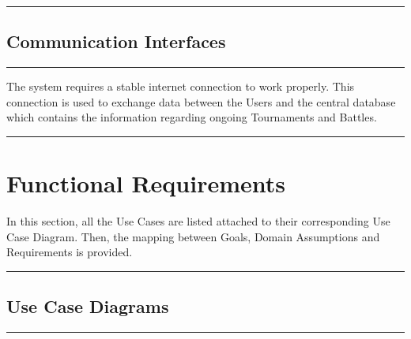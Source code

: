 \documentclass{Configuration_Files/Template}
\begin{document}
{\color{bluepoli}\rule{\linewidth}{0.1pt}}

\subsection{Communication Interfaces}

{\color{bluepoli}\rule{\linewidth}{0.1pt}}

The system requires a stable internet connection to work properly. This connection is used to exchange data between the Users and the central database which contains the information regarding ongoing Tournaments and Battles.\\

{\color{bluepoli}\rule{\linewidth}{0.1pt}}

\section{Functional Requirements}

In this section, all the Use Cases are listed attached to their corresponding Use Case Diagram. Then, the mapping between Goals, Domain Assumptions and Requirements is provided.\\
{\color{bluepoli}\rule{\linewidth}{0.1pt}}

\subsection{Use Case Diagrams}

{\color{bluepoli}\rule{\linewidth}{0.1pt}}
\end{document}
